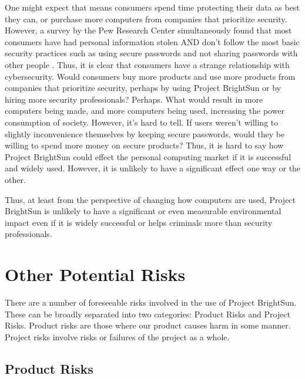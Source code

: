 \documentclass[openright]{report}
\begin{document}
\par One might expect that means consumers spend time protecting their data as best they can, or purchase more computers from companies that prioritize security. However, a survey by the Pew Research Center simultaneously found that most consumers have had personal information stolen AND don't follow the most basic security practices such as using secure passwords and not sharing passwords with other people \cite{security_survey_pew}. Thus, it is clear that consumers have a strange relationship with cybersecurity. Would consumers buy more products and use more products from companies that prioritize security, perhaps by using Project BrightSun or by hiring more security professionals? Perhaps. What would result in more computers being made, and more computers being used, increasing the power consumption of society. However, it's hard to tell. If users weren't willing to slightly inconvenience themselves by keeping secure passwords, would they be willing to spend more money on secure products? Thus, it is hard to say how Project BrightSun could effect the personal computing market if it is successful and widely used. However, it is unlikely to have a significant effect one way or the other.

\par Thus, at least from the perspective of changing how computers are used, Project BrightSun is unlikely to have a significant or even measurable environmental impact even if it is widely successful or helps criminals more than security professionals.

\section{Other Potential Risks}

\par There are a number of foreseeable risks involved in the use of Project BrightSun. These can be broadly separated into two categories: Product Risks and Project Risks. Product risks are those where our product causes harm in some manner. Project risks involve risks or failures of the project as a whole.

\subsection{Product Risks}
\end{document}
